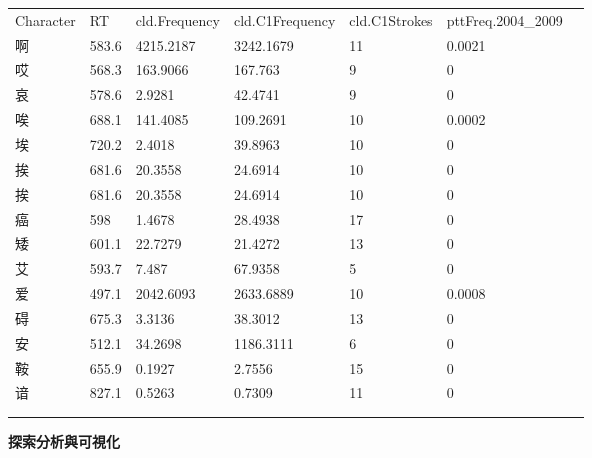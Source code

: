 \tablefirsthead{}

\tabletail{}
\tablelasttail{}
\begin{tabularx}{\textwidth}{XXXXXXXXXXX}
\lsptoprule
Character & \multicolumn{2}{X}{RT} & \multicolumn{2}{X}{cld.Frequency} & cld.C1Frequency & \multicolumn{2}{X}{cld.C1Strokes} & \multicolumn{2}{X}{pttFreq.2004\_2009} & \\
\hhline{----------~}
啊 & \multicolumn{2}{X}{583.6} & \multicolumn{2}{X}{4215.2187} & 3242.1679 & \multicolumn{2}{X}{11} & \multicolumn{2}{X}{0.0021} & \\
{}哎 & \multicolumn{2}{X}{568.3} & \multicolumn{2}{X}{163.9066} & 167.763 & \multicolumn{2}{X}{9} & \multicolumn{2}{X}{0} & \\
{}哀 & \multicolumn{2}{X}{578.6} & \multicolumn{2}{X}{2.9281} & 42.4741 & \multicolumn{2}{X}{9} & \multicolumn{2}{X}{0} & \\
{}唉 & \multicolumn{2}{X}{688.1} & \multicolumn{2}{X}{141.4085} & 109.2691 & \multicolumn{2}{X}{10} & \multicolumn{2}{X}{0.0002} & \\
{}埃 & \multicolumn{2}{X}{720.2} & \multicolumn{2}{X}{2.4018} & 39.8963 & \multicolumn{2}{X}{10} & \multicolumn{2}{X}{0} & \\
{}挨 & \multicolumn{2}{X}{681.6} & \multicolumn{2}{X}{20.3558} & 24.6914 & \multicolumn{2}{X}{10} & \multicolumn{2}{X}{0} & \\
{}挨 & \multicolumn{2}{X}{681.6} & \multicolumn{2}{X}{20.3558} & 24.6914 & \multicolumn{2}{X}{10} & \multicolumn{2}{X}{0} & \\
{}癌 & \multicolumn{2}{X}{598} & \multicolumn{2}{X}{1.4678} & 28.4938 & \multicolumn{2}{X}{17} & \multicolumn{2}{X}{0} & \\
{}矮 & \multicolumn{2}{X}{601.1} & \multicolumn{2}{X}{22.7279} & 21.4272 & \multicolumn{2}{X}{13} & \multicolumn{2}{X}{0} & \\
{}艾 & \multicolumn{2}{X}{593.7} & \multicolumn{2}{X}{7.487} & 67.9358 & \multicolumn{2}{X}{5} & \multicolumn{2}{X}{0} & \\
{}爱 & \multicolumn{2}{X}{497.1} & \multicolumn{2}{X}{2042.6093} & 2633.6889 & \multicolumn{2}{X}{10} & \multicolumn{2}{X}{0.0008} & \\
{}碍 & \multicolumn{2}{X}{675.3} & \multicolumn{2}{X}{3.3136} & 38.3012 & \multicolumn{2}{X}{13} & \multicolumn{2}{X}{0} & \\
{}安 & \multicolumn{2}{X}{512.1} & \multicolumn{2}{X}{34.2698} & 1186.3111 & \multicolumn{2}{X}{6} & \multicolumn{2}{X}{0} & \\
{}鞍 & \multicolumn{2}{X}{655.9} & \multicolumn{2}{X}{0.1927} & 2.7556 & \multicolumn{2}{X}{15} & \multicolumn{2}{X}{0} & \\
{}谙 & \multicolumn{2}{X}{827.1} & \multicolumn{2}{X}{0.5263} & 0.7309 & \multicolumn{2}{X}{11} & \multicolumn{2}{X}{0} & \\
\multicolumn{2}{X}{} & \multicolumn{2}{X}{} & \multicolumn{3}{X}{} & \multicolumn{2}{X}{} & \multicolumn{2}{X}{}\\
\lspbottomrule
\end{tabularx}
\textbf{探索分析與可視化}

